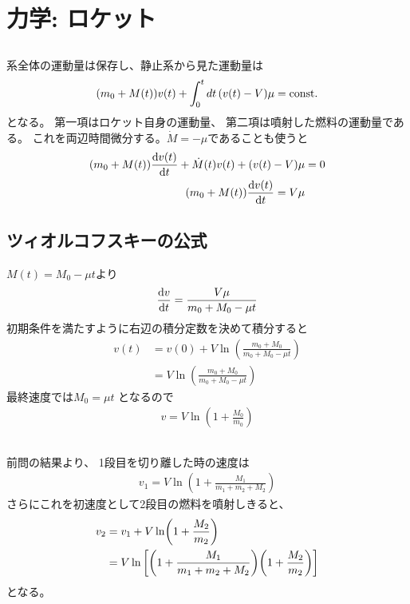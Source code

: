 \documentclass[../../master.tex]{subfiles}
\begin{document}
\chapter{力学: ロケット}
\section{}
系全体の運動量は保存し、静止系から見た運動量は
\begin{align}
    \qty(m_0+M(t))v(t) +\int_{0}^{t} dt\,\qty(v(t)-V)\mu=\text{const.}
\end{align}
となる。
第一項はロケット自身の運動量、
第二項は噴射した燃料の運動量である。
これを両辺時間微分する。\(\dot{M}=-\mu\)であることも使うと
\begin{align}
    \qty(m_0+M(t))\dv{v(t)}{t} +\dot{M}(t)v(t) + (v(t)-V)\mu &= 0\\
    \qty(m_0+M(t))\dv{v(t)}{t} = V\mu
\end{align}

\section{ツィオルコフスキーの公式}
\(M(t)=M_0-\mu t\)より
\begin{align}
    \dv{v}{t} = \frac{V\mu}{m_0+M_0-\mu t}
\end{align}
初期条件を満たすように右辺の積分定数を決めて積分すると
\begin{align}
    v(t) &= v(0) +V\ln(\frac{m_0+M_0}{m_0+M_0-\mu t})\\
    &= V\ln(\frac{m_0+M_0}{m_0+M_0-\mu t})
\end{align}
最終速度では\(M_0=\mu t\) となるので
\begin{align}
    v = V\ln(1+\frac{M_0}{m_0})
\end{align}

\section{}
前問の結果より、
1段目を切り離した時の速度は
\begin{align}
    v_1 = V\ln(1+\frac{M_1}{m_1+m_2+M_2})
\end{align}
さらにこれを初速度として2段目の燃料を噴射しきると、
\begin{align}
    v_2 &= v_1 + V\ln(1+\frac{M_2}{m_2})\\
    &= V\ln\qty[\qty(1+\frac{M_1}{m_1+m_2+M_2})\qty(1+\frac{M_2}{m_2})]
\end{align}
となる。
\end{document}
